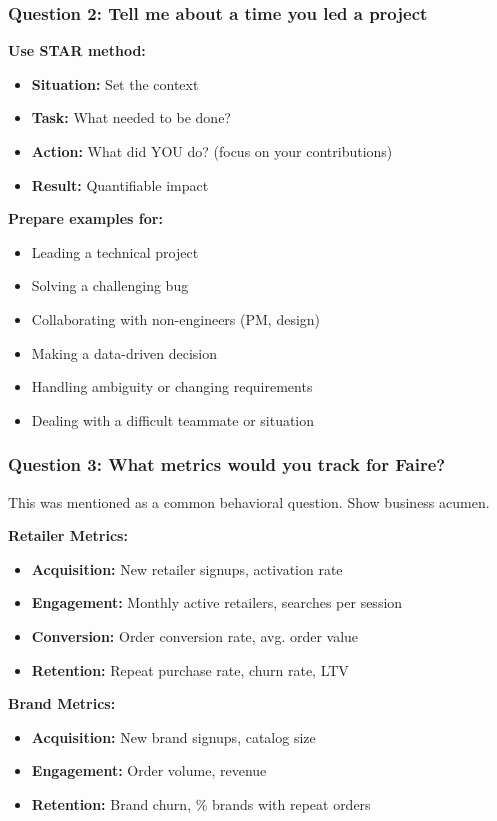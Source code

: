 \documentclass[11pt,letterpaper]{article}
\begin{document}
\subsubsection{Question 2: Tell me about a time you led a project}

\textbf{Use STAR method:}
\begin{itemize}
    \item \textbf{Situation:} Set the context
    \item \textbf{Task:} What needed to be done?
    \item \textbf{Action:} What did YOU do? (focus on your contributions)
    \item \textbf{Result:} Quantifiable impact
\end{itemize}

\textbf{Prepare examples for:}
\begin{itemize}
    \item Leading a technical project
    \item Solving a challenging bug
    \item Collaborating with non-engineers (PM, design)
    \item Making a data-driven decision
    \item Handling ambiguity or changing requirements
    \item Dealing with a difficult teammate or situation
\end{itemize}

\subsubsection{Question 3: What metrics would you track for Faire?}

This was mentioned as a common behavioral question. Show business acumen.

\textbf{Retailer Metrics:}
\begin{itemize}
    \item \textbf{Acquisition:} New retailer signups, activation rate
    \item \textbf{Engagement:} Monthly active retailers, searches per session
    \item \textbf{Conversion:} Order conversion rate, avg. order value
    \item \textbf{Retention:} Repeat purchase rate, churn rate, LTV
\end{itemize}

\textbf{Brand Metrics:}
\begin{itemize}
    \item \textbf{Acquisition:} New brand signups, catalog size
    \item \textbf{Engagement:} Order volume, revenue
    \item \textbf{Retention:} Brand churn, \% brands with repeat orders
\end{itemize}
\end{document}
